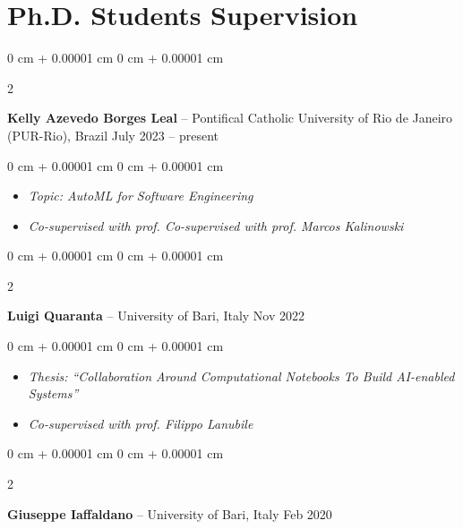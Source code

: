 \documentclass[10pt, a4paper]{article}
\newenvironment{highlights}{
    \begin{itemize}[
        topsep=0.10 cm,
        parsep=0.10 cm,
        partopsep=0pt,
        itemsep=0pt,
        leftmargin=0 cm + 10pt
    ]
}{
    \end{itemize}
} %
\newenvironment{onecolentry}{
    \begin{adjustwidth}{
        0 cm + 0.00001 cm
    }{
        0 cm + 0.00001 cm
    }
}{
    \end{adjustwidth}
} %
\newenvironment{twocolentry}[2][]{
    \onecolentry
    \def\secondColumn{#2}
    \setcolumnwidth{\fill, 4.5 cm}
    \begin{paracol}{2}
}{
    \switchcolumn \raggedleft \secondColumn
    \end{paracol}
    \endonecolentry
} %
\begin{document}
    
    \section{Ph.D. Students Supervision}



        
        \begin{twocolentry}{
            July 2023 – present
        }
            \textbf{Kelly Azevedo Borges Leal} -- Pontifical Catholic University of Rio de Janeiro (PUR-Rio), Brazil\end{twocolentry}

        \vspace{0.10 cm}
        \begin{onecolentry}
            \begin{highlights}
                \item \textit{Topic: AutoML for Software Engineering}
                \item \textit{Co-supervised with prof. Co-supervised with prof. Marcos Kalinowski}
            \end{highlights}
        \end{onecolentry}


        \vspace{0.2 cm}

        \begin{twocolentry}{
            Nov 2022
        }
            \textbf{Luigi Quaranta} -- University of Bari, Italy\end{twocolentry}

        \vspace{0.10 cm}
        \begin{onecolentry}
            \begin{highlights}
                \item \textit{Thesis: ``Collaboration Around Computational Notebooks To Build AI-enabled Systems''}
                \item \textit{Co-supervised with prof. Filippo Lanubile}
            \end{highlights}
        \end{onecolentry}


        \vspace{0.2 cm}

        \begin{twocolentry}{
            Feb 2020
        }
            \textbf{Giuseppe Iaffaldano} -- University of Bari, Italy\end{twocolentry}
\end{document}
